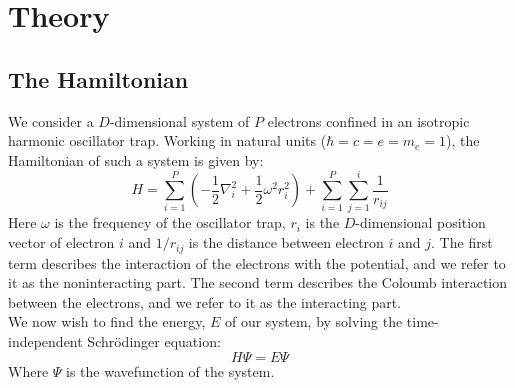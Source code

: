 \documentclass[a4paper, 10pt]{article}
\begin{document}
	\section{Theory}\label{sec:Theory}
	\subsection{The Hamiltonian}
	We consider a $D$-dimensional system of $P$ electrons confined in an isotropic harmonic oscillator trap. Working in natural units ($\hbar=c=e=m_e=1$), the Hamiltonian of such a system is given by:
	\begin{equation}\label{eq:Hamiltonian}
	H=\sum_{i=1}^P \left(-\frac{1}{2}\nabla_i^2 +\frac{1}{2}\omega^2 r_i^2\right)+\sum_{i=1}^P \sum_{j=1}^{i}\frac{1}{r_{ij}}
	\end{equation}
	Here $\omega$ is the frequency of the oscillator trap, $r_{i}$ is the $D$-dimensional position vector of electron $i$ and $1/r_{ij}$ is the distance between electron $i$ and $j$. The first term describes the interaction of the electrons with the potential, and we refer to it as the noninteracting part. The second term describes the Coloumb interaction between the electrons, and we refer to it as the interacting part.\\
	\linebreak
	We now wish to find the energy, $E$ of our system, by solving the time-independent Schrödinger equation:
	\begin{equation}\label{eq:time_depenedent_schrodinger}
	H\Psi = E\Psi
	\end{equation}
	Where $\Psi$ is the wavefunction of the system.
\end{document}
